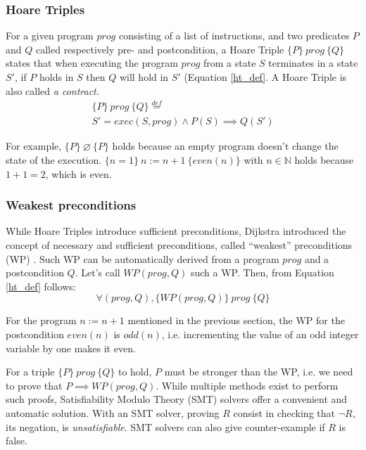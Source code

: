 \documentclass[10pt,a4paper]{article}
\newcommand{\htriple}[3]{\ensuremath{\{#1\}~#2~\{#3\}}}
\newcommand{\WP}{\ensuremath{\mathit{WP}}}
\newcommand{\eqdef}{\stackrel{def}{=}}
\begin{document}
\begin{multicols}{2}

\subsubsection{Hoare Triples} \label{hoare-triples}

For a given program $prog$ consisting of a list of instructions, and two predicates $P$ and $Q$ called respectively pre- and postcondition, a Hoare Triple \htriple{P}{prog}{Q} states that when executing the program $prog$ from a state $S$ terminates in a state $S'$, if $P$ holds in $S$ then $Q$ will hold in $S'$ (Equation \ref{ht_def}. A Hoare Triple is also called \textit{a contract}.
%
\begin{multline}
  \htriple{P}{prog}{Q} \eqdef\\
  S' = exec(S, prog) \land P(S) \implies Q(S')
  \label{ht_def}
\end{multline}

For example, \htriple{P}{\varnothing}{P} holds because an empty program doesn't change the state of the execution. \htriple{n=1}{n:=n+1}{even(n)} with $n \in \mathbb{N}$ holds because $1+1=2$, which is even.

\subsubsection{Weakest preconditions}

While Hoare Triples introduce sufficient preconditions, Dijkstra introduced the concept of necessary and sufficient preconditions, called ``weakest'' preconditions (WP) \cite{dijkstra_guarded_1975}. Such WP can be automatically derived from a program $prog$ and a postcondition $Q$. Let's call $\WP(prog, Q)$ such a WP. Then, from Equation \ref{ht_def} follows:
%
\begin{equation}
  \forall (prog, Q),
  \htriple{\WP(prog,Q)}{prog}{Q}
  \label{ht_wp_eq}
\end{equation}

For the program $n:=n+1$ mentioned in the previous section, the WP for the postcondition $even(n)$ is $odd(n)$, i.e. incrementing the value of an odd integer variable by one makes it even.

For a triple \htriple{P}{prog}{Q} to hold, $P$ must be stronger than the WP, i.e. we need to prove that $P \implies \WP(prog, Q)$. While multiple methods exist to perform such proofs, Satisfiability Modulo Theory ({SMT}) solvers offer a convenient and automatic solution. With an SMT solver, proving $R$ consist in checking that $\neg R$, its negation, is \textit{unsatisfiable}. SMT solvers can also give counter-example if $R$ is false.


\end{multicols}
\end{document}
